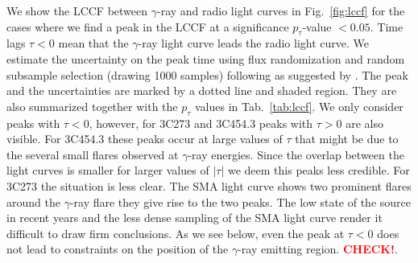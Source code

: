 \documentclass[twocolumn,linenumbers]{aastex62}
\newcommand{\gray}{$\gamma$-ray\xspace}
\newcommand{\todo}[1]{\textbf{\textcolor{red}{#1}}}
\begin{document}
We show the LCCF between \gray and radio light curves in Fig.~\ref{fig:lccf} for the cases where we find a peak in the LCCF at a significance $p_\tau$-value $<0.05$. Time lags $\tau < 0$ mean that the \gray light curve leads the radio light curve. 
We estimate the uncertainty on the peak time using flux randomization and random subsample selection (drawing 1000 samples) following \citet{1998PASP..110..660P} as suggested by \citet{2014MNRAS.445..437M}.
The peak and the uncertainties are marked by a dotted line and shaded region. 
They are also summarized together with the $p_\tau$ values in Tab.~\ref{tab:lccf}.
We only consider peaks with $\tau < 0$, however, 
for 3C273 and 3C454.3 peaks with $\tau > 0$ are also visible. 
For 3C454.3 these peaks occur at large values of $\tau$ that might be due to the several small flares observed at \gray energies. Since the overlap between the light curves is smaller for larger values of $|\tau|$ we deem this peaks less credible. 
For 3C273 the situation is less clear. 
The SMA light curve shows two prominent flares around the 
\gray flare they give rise to the two peaks. 
The low state of the source in recent years and the less dense sampling of the SMA light curve render it difficult to draw firm conclusions. As we see below, even the peak at $\tau < 0$ does not lead to constraints on the position of the \gray emitting region. \todo{CHECK!}.
\end{document}
